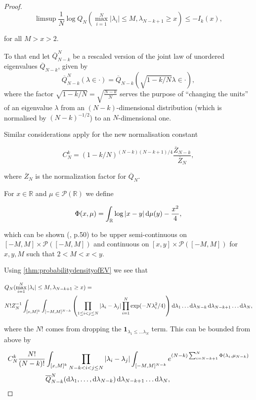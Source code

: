 \begin{proof}
	$$\limsup\frac{1}{N}\log Q_N(\max_{i=1}^N|\lambda_i|\leq M, \lambda_{N-k+1}\geq x)\leq-I_k(x),$$
	
	for all $M>x>2$.
	
	
	To that end let $\overline Q_{N-k}^N$ be a rescaled version of the joint law of unordered eigenvalues $\overline Q_{N-k}$, given by 
	$$\overline Q_{N-k}^N(\lambda\in\cdot) = \overline Q_{N-k}(\sqrt{1-k/N}\lambda\in\cdot),$$ where the factor $\sqrt{1-k/N}=\sqrt{\frac{N-k}{N}}$ serves the purpose of ``changing the units'' of an eigenvalue $\lambda$ from an $(N-k)$-dimensional distribution (which is normalised by $(N-k)^{-1/2}$) to an $N$-dimensional one.
	
	Similar considerations apply for the new normalisation constant 
	
	$$C_N^k = (1-k/N)^{(N-k)(N-k+1)/4}\frac{\overline Z_{N-k}}{\overline Z_N},$$
	
	where $\overline Z_N$ is the normalization factor for $\overline Q_N$.
	
	For $x\in\mathbb R$ and $\mu\in\mathcal P(\mathbb R)$ we define
	
	$$\Phi(x,\mu)=\int_\mathbb{R}\log|x-y|\mathop{}\!\mathrm{d}\mu(y)-\frac{x^2}{4},$$
	
	which can be shown (\cite{ArousAging}, p.50) to be upper semi-continuous on $[-M,M]\times\mathcal P([-M,M])$ and continuous on $[x,y]\times\mathcal P([-M,M])$ for $x,y,M$ such that $2<M<x<y$.
	
	Using \ref{thm:probabilitydensityofEV} we see that
	
	\begin{align*}
		&Q_N(\max_{i=1}^N|\lambda_i|\leq M,\lambda_{N-k+1}\geq x)= \\ &N! Z_N^{-1}\int_{[x,M]^k}\int_{[-M,M]^{N-k}}\left(\prod_{1\leq i<j\leq N}|\lambda_i-\lambda_j|\prod_{i=1}^N \exp(-N\lambda_i^2/4)\right)\mathop{}\!\mathrm{d}\lambda_1\dots\mathop{}\!\mathrm{d}\lambda_{N-k}\mathop{}\!\mathrm{d}\lambda_{N-k+1}\dots\mathop{}\!\mathrm{d}\lambda_N,
	\end{align*}
	
	where the $N!$ comes from dropping the $\mathbf 1_{\lambda_1\leq\dots\lambda_N}$ term. This can be bounded from above by
	
	\begin{align}\label{eq:upperbound1forQN}
		C_N^k\frac{N!}{(N-k)!}&\int_{[x,M]^k}\prod_{N-k<i<j\leq N}|\lambda_i-\lambda_j| \int_{[-M,M]^{N-k}}e^{(N-k)\sum_{i=N-k+1}^N\Phi(\lambda_i,\mu_{N-k})}\nonumber\\
		&\overline Q_{N-k}^N(\mathop{}\!\mathrm{d}\lambda_1,\dots,\mathop{}\!\mathrm{d}\lambda_{N-k})\mathop{}\!\mathrm{d}\lambda_{N-k+1}\dots\mathop{}\!\mathrm{d}\lambda_N,
	\end{align}
	

\end{proof}
